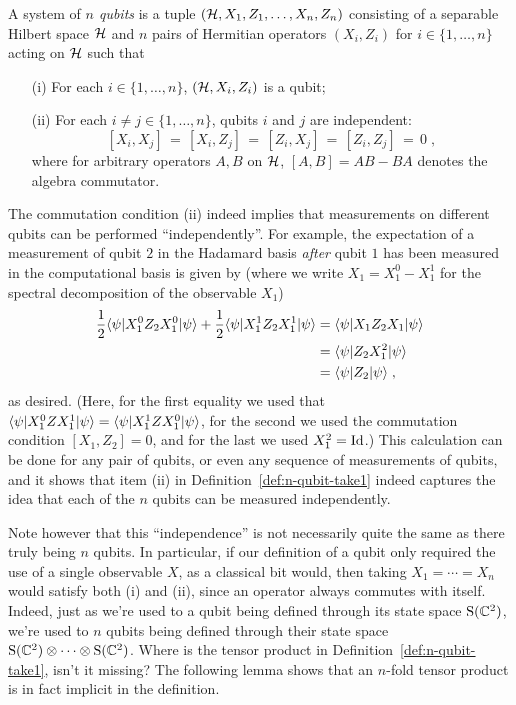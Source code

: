 \begin{definition}\label{def:n-qubit-take1}
A system of \emph{$n$ qubits} is a tuple $(\mathcal{H},X_1,Z_1,\ldots,X_n,Z_n)$ consisting of a separable Hilbert space $\mathcal{H}$ and $n$ pairs of Hermitian operators $(X_i,Z_i)$ for $i\in\{1,\ldots,n\}$ acting on $\mathcal{H}$ such that
\begin{enumerate}
\item[(i)] For each $i\in \{1,\ldots,n\}$, $(\mathcal{H},X_i,Z_i)$ is a qubit;
\item[(ii)] For each $i\neq j\in \{1,\ldots,n\}$, qubits $i$ and $j$ are independent:
\[ [X_i,X_j]\,=\,[X_i,Z_j]\,=\,[Z_i,X_j]\,=\,[Z_i,Z_j]\,=\,0\;,\]
where for arbitrary operators $A,B$ on $\mathcal{H}$, $[A,B]=AB-BA$ denotes the algebra commutator. 
\end{enumerate}
\end{definition}

The commutation condition (ii) indeed implies that measurements on different qubits can be performed ``independently''. For example, the expectation of a measurement of qubit $2$ in the Hadamard basis \emph{after} qubit $1$ has been measured in the computational basis is given by (where we write $X_1 = X_1^0 - X_1^1$ for the spectral decomposition of the observable $X_1$)
\begin{align*}
\frac{1}{2} \langle\psi| X_1^0 Z_2 X_1^0 |\psi\rangle + \frac{1}{2} \langle\psi| X_1^1 Z_2 X_1^1 |\psi\rangle &= \langle\psi| X_1 Z_2 X_1 |\psi\rangle \\
&= \langle\psi|  Z_2 X_1^2 |\psi\rangle\\
&= \langle\psi|  Z_2  |\psi\rangle\;,
\end{align*}
as desired. (Here, for the first equality we used that  $\langle\psi| X_1^0 Z X_1^1 |\psi\rangle  =  \langle\psi| X_1^1 Z X_1^0 |\psi\rangle $, for the second we used the commutation condition $[X_1,Z_2]=0$, and for the last we used $X_1^2=\mathop{\rm Id}\nolimits$.) This calculation can be done for any pair of qubits, or even any sequence of measurements of qubits, and it shows that item (ii) in Definition~\ref{def:n-qubit-take1} indeed captures the idea that each of the $n$ qubits can be measured independently. 

Note however that this ``independence'' is not necessarily quite the same as there truly being $n$ qubits. In particular, if our definition of a qubit only required the use of a single observable $X$, as a classical bit would, then taking $X_1=\cdots=X_n$ would satisfy both (i) and (ii), since an operator always commutes with itself. Indeed, just as we're used to a qubit being defined through its state space $\mathrm{S}(\mathbb{C}^2)$, we're used to $n$ qubits being defined through their state space $\mathrm{S}(\mathbb{C}^2)\otimes \cdots \otimes \mathrm{S}(\mathbb{C}^2)$. Where is the tensor product in Definition~\ref{def:n-qubit-take1}, isn't it missing? The following lemma shows that an $n$-fold tensor product is in fact implicit in the definition. 

